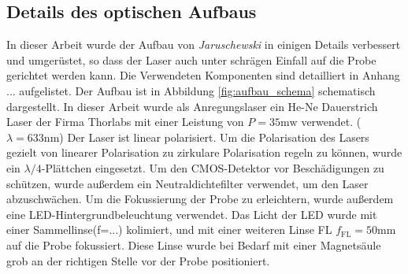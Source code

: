 \documentclass{article}
\begin{document}
\subsection{Details des optischen Aufbaus}
	In dieser Arbeit wurde der Aufbau von \textit{Jaruschewski} in einigen Details verbessert und umgerüstet, so dass der Laser auch unter schrägen Einfall auf die Probe gerichtet werden kann. Die Verwendeten Komponenten sind detailliert in Anhang ... aufgelistet. Der Aufbau ist in Abbildung \ref{fig:aufbau_schema} schematisch dargestellt. In dieser Arbeit wurde als Anregungslaser ein He-Ne Dauerstrich Laser der Firma Thorlabs mit einer Leistung von $P = 35\mathrm{mw}$ verwendet. ($\lambda = 633\mathrm{nm}$) Der Laser ist linear polarisiert. Um die Polarisation des Lasers gezielt von linearer Polarisation zu zirkulare Polarisation regeln zu können, wurde ein $\lambda/4$-Plättchen eingesetzt. Um den CMOS-Detektor vor Beschädigungen zu schützen, wurde außerdem ein Neutraldichtefilter verwendet, um den Laser abzuschwächen. Um die Fokussierung der Probe zu erleichtern, wurde außerdem eine LED-Hintergrundbeleuchtung verwendet. Das Licht der LED wurde mit einer Sammellinse(f=...) kolimiert, und mit einer weiteren Linse FL $f_{\mathrm{FL}}=50\mathrm{mm}$ auf die  Probe fokussiert. Diese Linse wurde bei Bedarf mit einer Magnetsäule grob an der richtigen Stelle vor der Probe positioniert.
\end{document}
